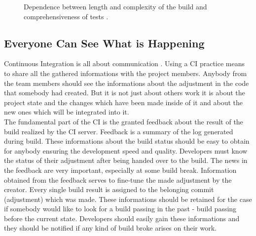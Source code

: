 \begin{figure}[H]
    \centering
    \caption{Dependence between length and complexity of the build and comprehensiveness of tests \cite{deployment_automation}.}
    \label{fig:grap_dependence}
\end{figure}

\subsection{Everyone Can See What is Happening}

Continuous Integration is all about communication \cite{MartinFowler}. Using a CI practice means to share all the gathered informations with the project members. Anybody from the team members should see the informations about the adjustment in the code that somebody had created. But it is not just about others work it is about the project state and the changes which have been made inside of it and about the new ones which will be integrated into it.\\

The fundamental part of the CI is the granted feedback about the result of the build realized by the CI server. Feedback is a summary of the log generated 
during build. These informations about the build status should be easy to obtain for anybody ensuring the development speed and quality. Developers must know the status of their adjustment after being handed over to the build. The news in the feedback are very important, especially at some build break. Information obtained from the feedback serves to fine-tune the made adjustment by the creator. Every single build result is assigned to the belonging commit (adjustment) which was made. These informations should be retained for the case if somebody would like to look for a build passing in the past - build passing before the current state. Developers should easily gain these informations and they should be notified if any kind of build broke arises on their work.

